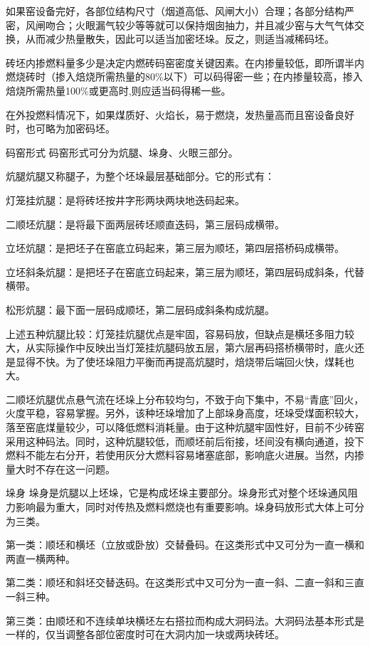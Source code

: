 \documentclass{ctexbook}
\begin{document}
如果窑设备完好，各部位结构尺寸（烟道高低、风闸大小）合理；各部分结构严密，风闸吻合；火眼漏气较少等等就可以保持烟囱抽力，并且减少窑与大气气体交换，从而减少热量散失，因此可以适当加密坯垛。反之，则适当减稀码坯。

砖坯内掺燃料量多少是决定内燃砖码窑密度关键因素。在内掺量较低，即所谓半内燃烧砖时（掺入焙烧所需热量的80\%以下）可以码得密一些；在内掺量较高，掺入焙烧所需热量100\%或更高时,则应适当码得稀一些。

在外投燃料情况下，如果煤质好、火焰长，易于燃烧，发热量高而且窑设备良好时，也可略为加密码坯。

码窑形式 码窑形式可分为炕腿、垛身、火眼三部分。

炕腿炕腿又称腿子，为整个坯垛最层基础部分。它的形式有：

灯笼挂炕腿：是将砖坯按井字形两块两块地迭码起来。

二顺坯炕腿：是将最下面两层砖坯顺直迭码，第三层码成横带。

立坯炕腿：是把坯子在窑底立码起来，第三层为顺坯，第四层搭桥码成横带。

立坯斜条炕腿：是把坯子在窑底立码起来，第三层为顺坯，第四层码成斜条，代替横带。

松形炕腿：最下面一层码成顺坯，第二层码成斜条构成炕腿。

上述五种炕腿比较：灯笼挂炕腿优点是牢固，容易码放，但缺点是横坯多阻力较大，从实际操作中反映出当灯笼挂炕腿码放五层，第六层再码搭桥横带时，底火还是显得不快。为了使坯垛阻力平衡而再提高炕腿时，焙烧带后端回火快，煤耗也大。

二顺坯炕腿优点悬气流在坯垛上分布较均匀，不致于向下集中，不易“青底”回火，火度平稳，容易掌握。另外，该种坯垛增加了上部垛身高度，坯垛受煤面积较大，落至窑底煤量较少，可以降低燃料消耗量。由于这种炕腿牢固性好，目前不少砖窑采用这种码法。同时，这种炕腿较低，而顺坯前后衔接，坯间没有横向通道，投下燃料不能左右分开，若使用灰分大燃料容易堵塞底部，影响底火进展。当然，内掺量大时不存在这一问题。

垛身 垛身是炕腿以上坯垛，它是构成坯垛主要部分。垛身形式对整个坯垛通风阻力影响最为重大，同时对传热及燃料燃烧也有重要影响。垛身码放形式大体上可分为三类。

第一类：顺坯和横坯（立放或卧放）交替叠码。在这类形式中又可分为一直一横和两直一横两种。

第二类：顺坯和斜坯交替迭码。在这类形式中又可分为一直一斜、二直一斜和三直一斜三种。

第三类：由顺坯和不连续单块横坯左右搭拉而构成大洞码法。大洞码法基本形式是一样的，仅当调整各部位密度时可在大洞内加一块或两块砖坯。
\end{document}
